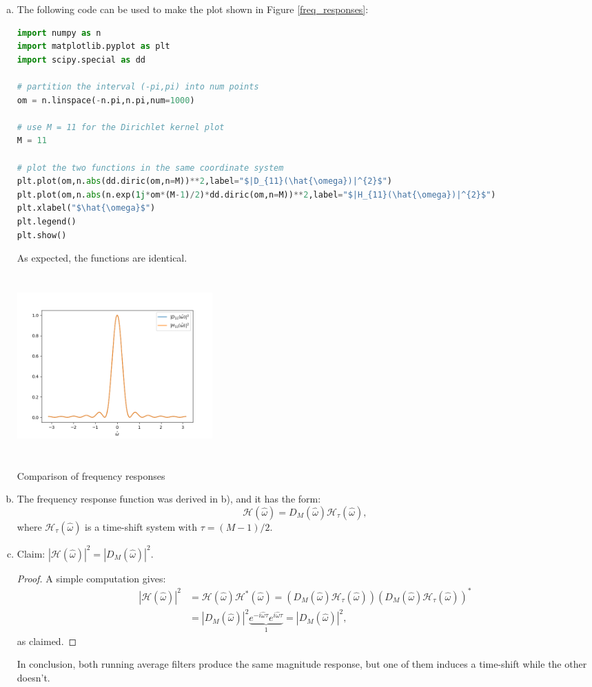 \begin{enumerate}
\begin{enumerate}[a)]
\item The following code can be used to make the plot shown in Figure \ref{freq_responses}:
\begin{lstlisting}[language=Python, caption=Plotting the frequency response code,label=code14_2]
import numpy as n
import matplotlib.pyplot as plt
import scipy.special as dd

# partition the interval (-pi,pi) into num points
om = n.linspace(-n.pi,n.pi,num=1000)

# use M = 11 for the Dirichlet kernel plot
M = 11

# plot the two functions in the same coordinate system
plt.plot(om,n.abs(dd.diric(om,n=M))**2,label="$|D_{11}(\hat{\omega})|^{2}$")
plt.plot(om,n.abs(n.exp(1j*om*(M-1)/2)*dd.diric(om,n=M))**2,label="$|H_{11}(\hat{\omega})|^{2}$")
plt.xlabel("$\hat{\omega}$")
plt.legend()
plt.show()
\end{lstlisting}
As expected, the functions are identical. 
\begin{marginfigure}
    \includegraphics[height=7.0cm,width=7.5cm]{ch11/figures/frequency_responses.png}
    \caption{Comparison of frequency responses}
    \label{freq_responses}
\end{marginfigure}

\item The frequency response function was derived in b), and it has the form:
$$\mathcal{H}(\hat{\omega})=D_{M}(\hat{\omega})\mathcal{H}_{\tau}(\hat{\omega}),$$
where $\mathcal{H}_{\tau}(\hat{\omega})$ is a time-shift system with $\tau=(M-1)/2$. 

\item Claim: $|\mathcal{H}(\hat{\omega})|^{2}=|D_{M}(\hat{\omega})|^{2}$.
\begin{proof}
A simple computation gives:
\begin{align*}
    |\mathcal{H}(\hat{\omega})|^{2}&=\mathcal{H}(\hat{\omega})\mathcal{H}^{*}(\hat{\omega})=(D_{M}(\hat{\omega})\mathcal{H}_{\tau}(\hat{\omega}))(D_{M}(\hat{\omega})\mathcal{H}_{\tau}(\hat{\omega}))^{*}\\
    &=|D_{M}(\hat{\omega})|^{2}\underbrace{e^{-i\hat{\omega}\tau}e^{i\hat{\omega}\tau}}_{1}=|D_{M}(\hat{\omega})|^{2},
\end{align*}
as claimed. 
\end{proof}
In conclusion, both running average filters produce the same magnitude response, but one of them induces a time-shift while the other doesn't. 
\end{enumerate}


\end{enumerate}
